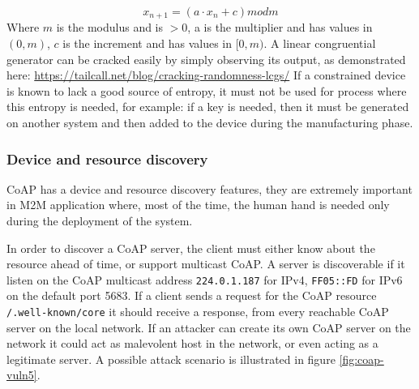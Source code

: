 	\begin{equation}
	x_{n+1}=(a\cdot x_n+c)mod m
	\end{equation}
	Where $m$ is the modulus and is $>0$, a is the multiplier and has values in $(0,m)$, $c$ is the increment and has values in $[0,m)$.
	A linear congruential generator can be cracked easily by simply observing its output, as demonstrated here:
	\url{https://tailcall.net/blog/cracking-randomness-lcgs/} \newline
	If a constrained device is known to lack a good source of entropy, it must not be used for process where this entropy is needed, for example: if a key is needed, then it must be generated on another system and then added to the device during the manufacturing phase.
	
	\subsubsection{Device and resource discovery}
	CoAP has a device and resource discovery features, they are extremely important in M2M application where, most of the time, the human hand is needed only during the deployment of the system.\newline
	
	In order to discover a CoAP server, the client must either know about the resource ahead of time, or support multicast CoAP.\newline
	A server is discoverable if it listen on the CoAP multicast address \texttt{224.0.1.187} for IPv4, \texttt{FF05::FD} for IPv6 on the default port 5683.\newline
	If a client sends a request for the CoAP resource \texttt{/.well-known/core} it should receive a response, from every reachable CoAP server on the local network.
	If an attacker can create its own CoAP server on the network it could act as malevolent host in the network, or even acting as a legitimate server.
	A possible attack scenario is illustrated in figure \ref{fig:coap-vuln5}.
	
